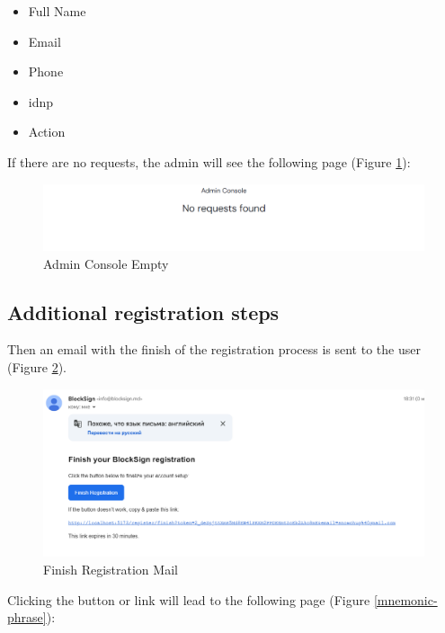 \begin{itemize}
    \item Full Name
    \item Email
    \item Phone
    \item idnp
    \item Action
\end{itemize}

If there are no requests, the admin will see the following page (Figure \ref{admin-console-empty}):

\begin{figure}[H]
    \centering
    \includegraphics[width=18cm]{"images/siteUI/adminConsoleNoRequests.png"}
    \caption{Admin Console Empty}
    \label{admin-console-empty}
\end{figure}

\subsection{Additional registration steps}

Then an email with the finish of the registration process is sent to the user (Figure \ref{finish-registration-mail}).

\begin{figure}[H]
    \centering
    \includegraphics[width=18cm]{"images/siteUI/finishRegMail.png"}
    \caption{Finish Registration Mail}
    \label{finish-registration-mail}
\end{figure}

Clicking the button or link will lead to the following page (Figure \ref{mnemonic-phrase}):

